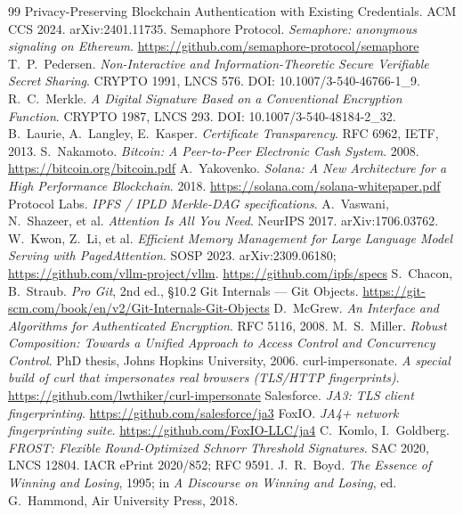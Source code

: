 \documentclass[11pt]{article}
\begin{document}
\begin{thebibliography}{99}
{Privacy-Preserving Blockchain Authentication with Existing Credentials}. ACM CCS
2024. arXiv:2401.11735.
 Semaphore Protocol. \emph{Semaphore: anonymous signaling on
Ethereum}. \url{https://github.com/semaphore-protocol/semaphore}
 T.~P.~Pedersen. \emph{Non-Interactive and
Information-Theoretic Secure Verifiable Secret Sharing}. CRYPTO 1991, LNCS 576.
DOI: 10.1007/3-540-46766-1\_9.
 R.~C.~Merkle. \emph{A Digital Signature Based on a Conventional
Encryption Function}. CRYPTO 1987, LNCS 293. DOI: 10.1007/3-540-48184-2\_32.
 B.~Laurie, A.~Langley, E.~Kasper. \emph{Certificate
Transparency}. RFC 6962, IETF, 2013.
 S.~Nakamoto. \emph{Bitcoin: A Peer-to-Peer Electronic Cash
System}. 2008. \url{https://bitcoin.org/bitcoin.pdf}
 A.~Yakovenko. \emph{Solana: A New Architecture for a High
Performance Blockchain}. 2018. \url{https://solana.com/solana-whitepaper.pdf}
 Protocol Labs. \emph{IPFS / IPLD Merkle-DAG specifications}.
 A.~Vaswani, N.~Shazeer, et al. \emph{Attention Is All You
Need}. NeurIPS 2017. arXiv:1706.03762.
 W.~Kwon, Z.~Li, et al. \emph{Efficient Memory Management
for Large Language Model Serving with PagedAttention}. SOSP 2023. arXiv:2309.06180;
\url{https://github.com/vllm-project/vllm}.
\url{https://github.com/ipfs/specs}
 S.~Chacon, B.~Straub. \emph{Pro Git}, 2nd ed., \S10.2 Git
Internals --- Git Objects. \url{https://git-scm.com/book/en/v2/Git-Internals-Git-Objects}
 D.~McGrew. \emph{An Interface and Algorithms for Authenticated
Encryption}. RFC 5116, 2008.
 M.~S.~Miller. \emph{Robust Composition: Towards a Unified Approach
to Access Control and Concurrency Control}. PhD thesis, Johns Hopkins University,
2006.
 curl-impersonate. \emph{A special build of curl that
impersonates real browsers (TLS/HTTP fingerprints)}.
\url{https://github.com/lwthiker/curl-impersonate}
 Salesforce. \emph{JA3: TLS client fingerprinting}.
\url{https://github.com/salesforce/ja3}
 FoxIO. \emph{JA4+ network fingerprinting suite}.
\url{https://github.com/FoxIO-LLC/ja4}
 C.~Komlo, I.~Goldberg. \emph{FROST: Flexible Round-Optimized
Schnorr Threshold Signatures}. SAC 2020, LNCS 12804. IACR ePrint 2020/852; RFC 9591.
 J.~R.~Boyd. \emph{The Essence of Winning and Losing}, 1995; in
\emph{A Discourse on Winning and Losing}, ed. G.~Hammond, Air University Press, 2018.
\end{thebibliography}
\end{document}
